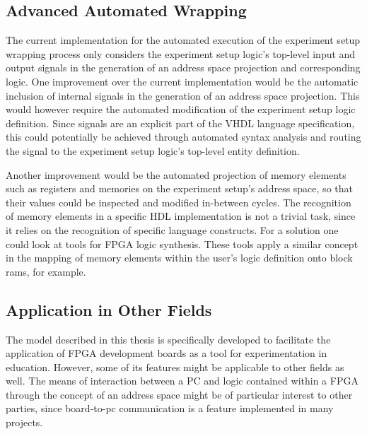 \documentclass[main.tex]{subfiles}
\begin{document}
\subsection{Advanced Automated Wrapping}
The current implementation for the automated execution of the experiment setup wrapping process only considers the experiment setup logic's top-level input and output signals in the generation of an address space projection and corresponding logic. One improvement over the current implementation would be the automatic inclusion of internal signals in the generation of an address space projection. This would however require the automated modification of the experiment setup logic definition. Since signals are an explicit part of the VHDL language specification, this could potentially be achieved through automated syntax analysis and routing the signal to the experiment setup logic's top-level entity definition.

Another improvement would be the automated projection of memory elements such as registers and memories on the experiment setup's address space, so that their values could be inspected and modified in-between cycles. The recognition of memory elements in a specific HDL implementation is not a trivial task, since it relies on the recognition of specific language constructs. For a solution one could look at tools for FPGA logic synthesis. These tools apply a similar concept in the mapping of memory elements within the user's logic definition onto block rams, for example. 

\subsection{Application in Other Fields}
The model described in this thesis is specifically developed to facilitate the application of FPGA development boards as a tool for experimentation in education. However, some of its features might be applicable to other fields as well. The means of interaction between a PC and logic contained within a FPGA through the concept of an address space might be of particular interest to other parties, since board-to-pc communication is a feature implemented in many projects. 
\end{document}
